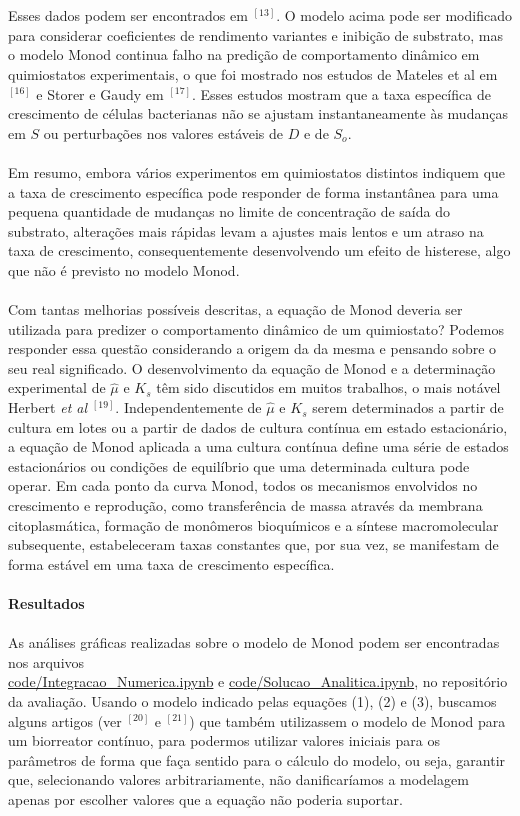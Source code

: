 \documentclass{article}
\begin{document}
\\\\Esses dados podem ser encontrados em $^{[13]}$. O modelo acima pode ser modificado para considerar coeficientes de rendimento variantes e inibição de substrato, mas o modelo Monod continua falho na predição de comportamento dinâmico em quimiostatos experimentais, o que foi mostrado nos estudos de Mateles et al em $^{[16]}$ e Storer e Gaudy em $^{[17]}$. Esses estudos mostram que a taxa específica de crescimento de células bacterianas não se ajustam instantaneamente às mudanças em $S$ ou perturbações nos valores estáveis de $D$ e de $S_o$.
\\\\Em resumo, embora vários experimentos em quimiostatos distintos indiquem que a taxa de crescimento específica pode responder de forma instantânea para uma pequena quantidade de mudanças no limite de concentração de saída do substrato, alterações mais rápidas levam a ajustes mais lentos e um atraso na taxa de crescimento, consequentemente desenvolvendo um efeito de histerese, algo que não é previsto no modelo Monod.
\\\\Com tantas melhorias possíveis descritas, a equação de Monod deveria ser utilizada para predizer o comportamento dinâmico de um quimiostato? Podemos responder essa questão considerando a origem da da mesma e pensando sobre o seu real significado. O desenvolvimento da equação de Monod e a determinação experimental de $\hat{\mu}$ e $K_s$ têm sido discutidos em muitos trabalhos, o mais notável Herbert \textit{et al} $^{[19]}$. Independentemente de $\hat{\mu}$ e $K_s$ serem determinados a partir de cultura em lotes ou a partir de dados de cultura contínua em estado estacionário, a equação de Monod aplicada a uma cultura contínua define uma série de estados estacionários ou condições de equilíbrio que uma determinada cultura pode operar. Em cada ponto da curva Monod, todos os mecanismos envolvidos no crescimento e reprodução, como transferência de massa através da membrana citoplasmática, formação de monômeros bioquímicos e a síntese macromolecular subsequente, estabeleceram taxas constantes que, por sua vez, se manifestam de forma estável em uma taxa de crescimento específica. 
\\\\
\textbf{\Large{Resultados}}
\\\\As análises gráficas realizadas sobre o modelo de Monod podem ser encontradas nos arquivos
\\ \href{https://github.com/RaphaLevy/Artigo_Fenomenos_Biologicos/blob/main/code/Integracao_Numerica.ipynb}{code/Integracao\_Numerica.ipynb} e \href{https://github.com/RaphaLevy/Artigo_Fenomenos_Biologicos/blob/main/code/Solucao_Analitica.ipynb}{code/Solucao\_Analitica.ipynb}, no repositório da avaliação. Usando o modelo indicado pelas equações (1), (2) e (3), buscamos alguns artigos (ver $^{[20]}$ e $^{[21]}$) que também utilizassem o modelo de Monod para um biorreator contínuo, para podermos utilizar valores iniciais para os parâmetros de forma que faça sentido para o cálculo do modelo, ou seja, garantir que, selecionando valores arbitrariamente, não danificaríamos a modelagem apenas por escolher valores que a equação não poderia suportar. 
\end{document}
